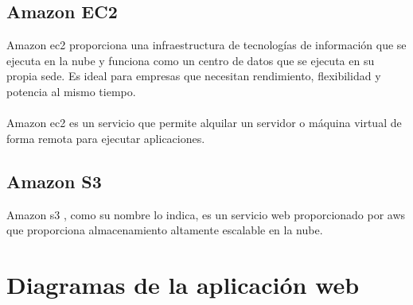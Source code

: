\documentclass[12pt, a4paper, titlepage]{article}
\begin{document}
	\subsection{Amazon EC2}	
	Amazon \acrfull{ec2} \cite{amazon_ec2} proporciona una infraestructura de tecnologías de información que se ejecuta en la nube y funciona como un centro de datos que se ejecuta en su propia sede. Es ideal para empresas que necesitan rendimiento, flexibilidad y potencia al mismo tiempo.\\\\
	Amazon \acrshort{ec2} es un servicio que permite alquilar un servidor o máquina virtual de forma remota para ejecutar aplicaciones.

	\subsection{Amazon S3}
	Amazon \acrfull{s3} \cite{amazon_s3}, como su nombre lo indica, es un servicio web proporcionado por \acrfull{aws} que proporciona almacenamiento altamente escalable en la nube.
	\newpage
	\section{Diagramas de la aplicación web}
\end{document}
